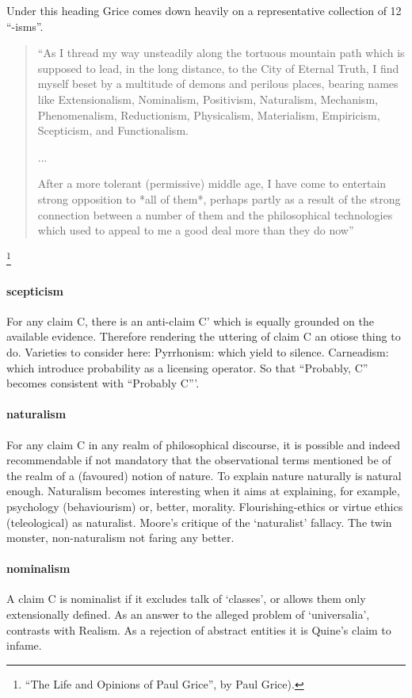 \documentclass[10pt,titlepage]{book}
\begin{document}
Under this heading Grice comes down heavily on a representative collection of 12 ``-isms''.

\begin{quote}
``As I thread my way unsteadily along the tortuous mountain 
path which is supposed to lead, in the long distance, to the City of Eternal Truth, I find myself beset by a  
multitude of demons and perilous places, bearing names like  
Extensionalism, Nominalism, Positivism, Naturalism, Mechanism,  
Phenomenalism, Reductionism, Physicalism, Materialism,  
Empiricism, Scepticism, and Functionalism.

...

After a more tolerant (permissive) middle age, I have come to entertain strong opposition to *all of them*, perhaps partly as a result of the strong connection between a number of them and the philosophical technologies which used to appeal to me a good deal more than they do  now''
\end{quote}
\footnote{``The Life and Opinions of Paul Grice'', by Paul Grice).\cite{grice86c}}

\paragraph{scepticism}

For any claim C, there is an anti-claim C' which is equally grounded on the available evidence.
Therefore rendering the uttering of claim C an otiose thing to do.
Varieties to consider here: Pyrrhonism: which yield to silence.
Carneadism: which introduce probability as a licensing operator.
So that ``Probably, C'' becomes consistent with ``Probably C'''. 

\paragraph{naturalism}

For any claim C in any realm of philosophical discourse,
it is possible and indeed recommendable if not mandatory that the observational 
terms mentioned be of the realm of a (favoured) notion of nature.
To explain nature naturally is natural enough.
Naturalism becomes interesting when it aims at explaining, for example, psychology
(behaviourism) or, better, morality.
Flourishing-ethics or virtue ethics (teleological) as naturalist. 
Moore's critique of the `naturalist' fallacy.
The twin monster, non-naturalism not faring any better.
 
\paragraph{nominalism} A claim C is nominalist if it excludes talk of `classes', or  
allows them only extensionally defined.
As an answer to the alleged problem of `universalia', contrasts with Realism.
As a rejection of abstract entities it is Quine's claim to infame.
 
\end{document}
